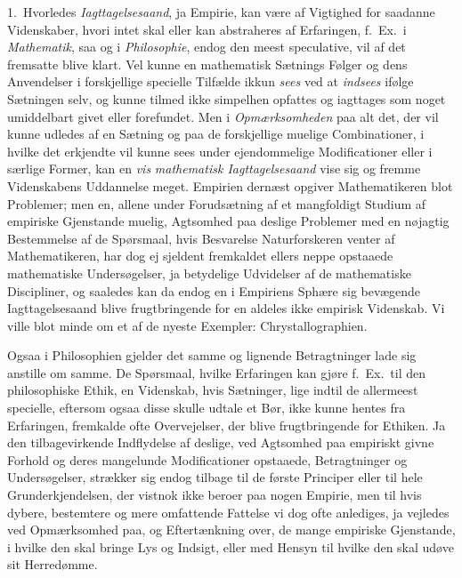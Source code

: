 \documentclass[12pt,a4paper]{book}
\newcommand{\apage}[1]{\marginnote{\footnotesize\textit{[#1]}}}
\begin{document}
1.~Hvorledes \emph{Iagttagelsesaand}, ja Empirie, kan være af Vigtighed for
saadanne Videnskaber, hvori intet skal eller kan abstraheres af Erfaringen,
f.~Ex.\ i \emph{Mathematik}, saa og i \emph{Philosophie}, endog den meest
speculative, vil af det fremsatte blive klart. Vel kunne en mathematisk Sætnings
Følger og dens Anvendelser i forskjellige specielle Tilfælde ikkun \emph{sees} ved
at \emph{indsees} ifølge Sætningen selv, og kunne tilmed ikke simpelhen opfattes og
iagttages som noget umiddelbart givet eller forefundet. Men i \emph{Opmærksomheden}
paa alt det, der vil kunne udledes af en Sætning og paa de forskjellige muelige
Combinationer, i hvilke det erkjendte vil kunne sees under ejendommelige
Modificationer eller i særlige Former, kan en \emph{vis} \apage{149} \emph{mathematisk Iagttagelsesaand} vise
sig og fremme Videnskabens Uddannelse meget. Empirien dernæst opgiver
Mathematikeren blot Problemer; men en, allene under Forudsætning af et mangfoldigt
Studium af empiriske Gjenstande muelig, Agtsomhed paa deslige Problemer med en
nøjagtig Bestemmelse af de Spørsmaal, hvis Besvarelse Naturforskeren venter af
Mathematikeren, har dog ej sjeldent fremkaldet ellers neppe opstaaede mathematiske
Undersøgelser, ja betydelige Udvidelser af de mathematiske Discipliner, og
saaledes kan da endog en i Empiriens Sphære sig bevægende Iagttagelsesaand blive
frugtbringende for en aldeles ikke empirisk Videnskab. Vi ville blot minde om et
af de nyeste Exempler: Chrystallographien.

Ogsaa i Philosophien gjelder det samme og lignende Betragtninger lade sig anstille
om samme. De Spørsmaal, hvilke Erfaringen kan gjøre f.~Ex.\ til den philosophiske
Ethik, en Videnskab, hvis Sætninger, lige indtil de allermeest specielle,
eftersom ogsaa disse skulle udtale et Bør, ikke kunne hentes fra Erfaringen,
fremkalde ofte Overvejelser, der blive frugtbringende for Ethiken. Ja den
tilbagevirkende Indflydelse af deslige, ved Agtsomhed paa empiriskt givne Forhold og
deres mangelunde Modificationer opstaaede, Betragtninger og Undersøgelser,
strækker sig endog tilbage til de første Principer eller til hele  \apage{150}
Grunderkjendelsen, der vistnok ikke beroer paa nogen Empirie, men til hvis dybere,
bestemtere og mere omfattende Fattelse vi dog ofte anlediges, ja vejledes ved
Opmærksomhed paa, og Eftertænkning over, de mange empiriske Gjenstande, i hvilke
den skal bringe Lys og Indsigt, eller med Hensyn til hvilke den skal udøve sit
Herredømme.
\end{document}
